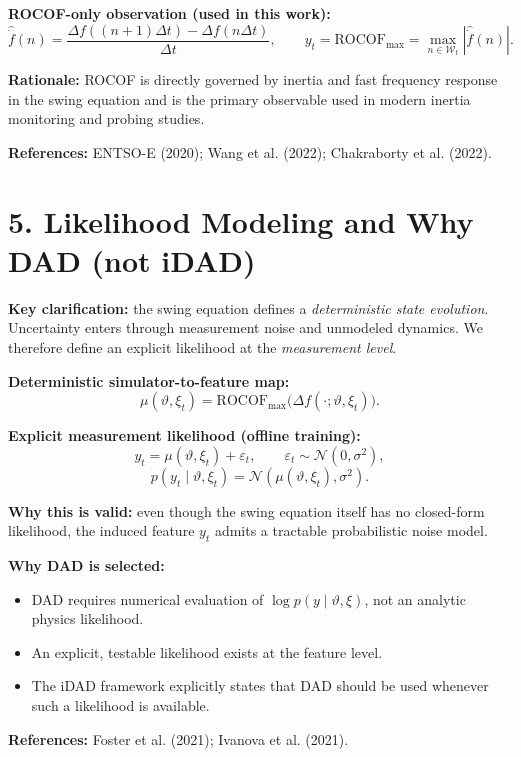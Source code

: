 \documentclass[12pt]{article}
\begin{document}
\textbf{ROCOF-only observation (used in this work):}
\[
\widehat{\dot f}(n)=
\frac{\Delta f((n+1)\Delta t)-\Delta f(n\Delta t)}{\Delta t},
\qquad
y_t=\mathrm{ROCOF}_{\max}
=\max_{n\in\mathcal{W}_t}|\widehat{\dot f}(n)|.
\]

\textbf{Rationale:}
ROCOF is directly governed by inertia and fast frequency response in the swing equation and is the primary observable used in modern inertia monitoring and probing studies.

\textbf{References:}
ENTSO-E (2020); Wang et al. (2022); Chakraborty et al. (2022).

\newpage
\section*{5. Likelihood Modeling and Why DAD (not iDAD)}

\textbf{Key clarification:}
the swing equation defines a \emph{deterministic state evolution}.
Uncertainty enters through measurement noise and unmodeled dynamics.
We therefore define an explicit likelihood at the \emph{measurement level}.

\textbf{Deterministic simulator-to-feature map:}
\[
\mu(\vartheta,\xi_t)
=
\mathrm{ROCOF}_{\max}\big(\Delta f(\cdot;\vartheta,\xi_t)\big).
\]

\textbf{Explicit measurement likelihood (offline training):}
\[
y_t = \mu(\vartheta,\xi_t) + \varepsilon_t,
\qquad
\varepsilon_t\sim\mathcal{N}(0,\sigma^2),
\]
\[
p(y_t\mid \vartheta,\xi_t)=
\mathcal{N}\!\left(\mu(\vartheta,\xi_t),\sigma^2\right).
\]

\textbf{Why this is valid:}
even though the swing equation itself has no closed-form likelihood,
the induced feature $y_t$ admits a tractable probabilistic noise model.

\textbf{Why DAD is selected:}
\begin{itemize}
\item DAD requires numerical evaluation of $\log p(y\mid\vartheta,\xi)$, not an analytic physics likelihood.
\item An explicit, testable likelihood exists at the feature level.
\item The iDAD framework explicitly states that DAD should be used whenever such a likelihood is available.
\end{itemize}

\textbf{References:}
Foster et al. (2021); Ivanova et al. (2021).
\end{document}
